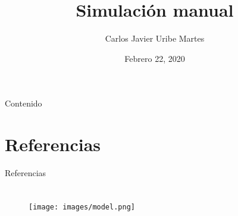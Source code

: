 \documentclass[aspectratio=43, xcolor=table]{beamer}
\title{Simulación manual} %
\author[C.J. Uribe-Martes]{Carlos Javier Uribe Martes}
\institute[CUC]{
    Ingeniería Industrial%
    \\%
    Universidad de la Costa%
} %
\date{Febrero 22, 2020}
\begin{document}
    
    \frame{\titlepage}
    
    \begin{frame}{Contenido}
        \tableofcontents
    \end{frame}
    
    
    
    
    
    
    
    \section*{Referencias} %
    \nocite{rossetti}
    \nocite{BCN}
    \nocite{LK}
        \begin{frame}{Referencias}
            \printbibliography
        \end{frame}
     
    \section{}   
        \begin{frame}{}
            \begin{figure}
                \centering
                \texttt{[image: images/model.png]}
            \end{figure}
        \end{frame}
\end{document}
